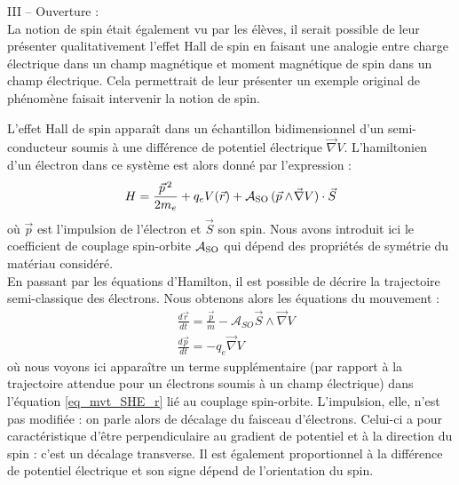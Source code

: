 \documentclass[a4paper,11pt]{article} %
\newenvironment{encart}[1]{%
	\begin{tcolorbox}
		[
		breakable, enhanced jigsaw, %
		arc = 1mm, %
		title = \textbf{#1}, %
		coltitle = white, %
		colbacktitle = blue, %
		colback = white, %
		colframe = blue %
		]
}{		
	\end{tcolorbox}
}
\begin{document}
\begin{encart}{Activité pédagogique 1 : étude de l'effet Hall classique}
		\vspace{0.5cm}
		III -- Ouverture :\\
		La notion de spin était également vu par les élèves, il serait possible de leur présenter qualitativement l'effet Hall de spin en faisant une analogie entre charge électrique dans un champ magnétique et moment magnétique de spin dans un champ électrique. Cela permettrait de leur présenter un exemple original de phénomène faisait intervenir la notion de spin.
	\end{encart}
	
	L'effet Hall de spin apparaît dans un échantillon bidimensionnel d'un semi-conducteur soumis à une différence de potentiel électrique $\vec{\nabla} V$. L'hamiltonien d'un électron dans ce système est alors donné par l'expression :
	\begin{equation*}
		\label{exp_hamiltonien_SHE}
		H = \frac{\vec{p}^{\, 2}}{2m_e} + q_e V(\vec{r}) + \mathcal{A}_\textup{SO} \, (\vec{p} \wedge \! \vec{\nabla} V) \cdot \vec{S}
	\end{equation*}
	où $ \vec{p} $ est l'impulsion de l'électron et $ \vec{S} $ son spin. Nous avons introduit ici le coefficient de couplage spin-orbite $ \mathcal{A}_\textup{SO} $ qui dépend des propriétés de symétrie du matériau considéré.\\
	
	En passant par les équations d'Hamilton, il est possible de décrire la trajectoire semi-classique des électrons. Nous obtenons alors les équations du mouvement :
	\begin{align}
		& \frac{d\vec{r}}{dt} = \frac{\vec{p}}{m} - \mathcal{A}_{SO} \vec{S} \wedge \vec{\nabla} V \label{eq_mvt_SHE_r} \\
		& \frac{d \vec{p}}{dt} = - q_e \vec{\nabla} V \label{eq_mvt_SHE_p}
	\end{align}
	où nous voyons ici apparaître un terme supplémentaire (par rapport à la trajectoire attendue pour un électrons soumis à un champ électrique) dans l'équation \eqref{eq_mvt_SHE_r} lié au couplage spin-orbite. L'impulsion, elle, n'est pas modifiée : on parle alors de décalage du faisceau d'électrons. Celui-ci a pour caractéristique d'être perpendiculaire au gradient de potentiel et à la direction du spin : c'est un décalage transverse. Il est également proportionnel à la différence de potentiel électrique et son signe dépend de l'orientation du spin.
	
	
\end{document}
